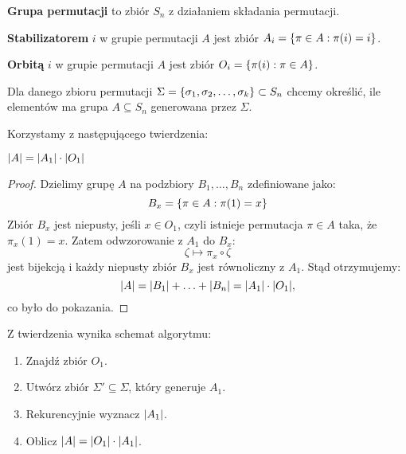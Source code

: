 \begin{definition}
    \textbf{Grupa permutacji} to zbiór \( S_n \) z działaniem składania permutacji.
\end{definition}

\begin{definition}
    \textbf{Stabilizatorem} \( i \) w grupie permutacji \( A \) jest zbiór \( A_i = \set{\pi \in A : \pi(i) = i} \).
\end{definition}

\begin{definition}
    \textbf{Orbitą} \( i \) w grupie permutacji \( A \) jest zbiór \(O_i = \set{\pi(i) : \pi \in A}\).
\end{definition}

Dla danego zbioru permutacji \(\Sigma = \set{\sigma_1, \sigma_2, \ldots, \sigma_k} \subset S_n\) chcemy określić, ile elementów ma grupa \(A \subseteq S_n\) generowana przez \(\Sigma\).

Korzystamy z następującego twierdzenia:
\begin{theorem}
    \( \left\lvert A\right\rvert = \left\lvert A_1\right\rvert \cdot \left\lvert O_1\right\rvert \)
\end{theorem}
\begin{proof}
    Dzielimy grupę \( A \) na podzbiory \( B_1, \ldots, B_n \) zdefiniowane jako:
    \[
        B_x = \set{\pi \in A : \pi(1) = x}
    \]
    Zbiór \( B_x \) jest niepusty, jeśli \( x \in O_1 \), czyli istnieje permutacja \( \pi \in A \) taka, że \(\pi_x(1) = x\).
    Zatem odwzorowanie z \( A_1 \) do \( B_x \):
    \[
        \zeta \mapsto \pi_x \circ \zeta
    \]
    jest bijekcją i każdy niepusty zbiór \( B_x \) jest równoliczny z \( A_1 \). Stąd otrzymujemy:
    \[
        \abs{A} = \abs{B_1} + \ldots + \abs{B_n} = \abs{A_1} \cdot \abs{O_1},
    \]
    co było do pokazania.
\end{proof}

Z twierdzenia wynika schemat algorytmu:
\begin{greyframe}
    \begin{enumerate}
        \item Znajdź zbiór \( O_1 \).
        \item Utwórz zbiór \( \Sigma' \subseteq \Sigma \), który generuje \( A_1 \).
        \item Rekurencyjnie wyznacz \(\left\lvert A_1\right\rvert\).
        \item Oblicz \(\left\lvert A\right\rvert = \left\lvert O_1\right\rvert \cdot \left\lvert A_1\right\rvert\).
    \end{enumerate}
\end{greyframe}

